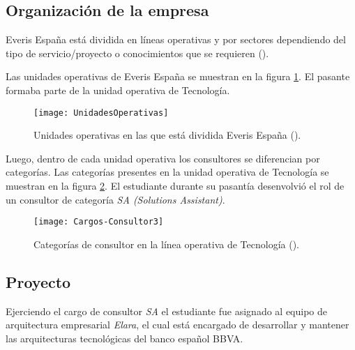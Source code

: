 \subsection{Organización de la empresa}

Everis España está dividida en líneas operativas y por sectores
dependiendo del tipo de servicio/proyecto o conocimientos que se requieren (\cite{MANUAL}).

Las unidades operativas de Everis España se muestran en la figura \ref{unidades}.
El pasante formaba parte de la unidad operativa de Tecnología.

\begin{figure}[h!]
\centering
\texttt{[image: UnidadesOperativas]}
\caption[Unidades Operativas de Everis]{Unidades operativas en las que
        está dividida Everis España (\cite{MANUAL}).}
\label{unidades}
\end{figure}


Luego, dentro de cada unidad operativa los consultores se diferencian por categorías.
Las categorías presentes en la unidad operativa de Tecnología se muestran en la
figura \ref{categorias}.
El estudiante durante su pasantía desenvolvió el rol de un consultor de categoría
\emph{SA (Solutions Assistant)}.

\begin{figure}[h!]
\centering
\texttt{[image: Cargos-Consultor3]}
\caption[Categorías en Tecnología]{Categorías de consultor en la línea operativa
  de Tecnología (\cite{MANUAL}).}
\label{categorias}
\end{figure}

\subsection{Proyecto}
Ejerciendo el cargo de consultor \emph{SA} el estudiante fue asignado al equipo
de arquitectura empresarial \emph{Elara}, el cual está encargado de desarrollar
y mantener las arquitecturas tecnológicas del banco español BBVA.
